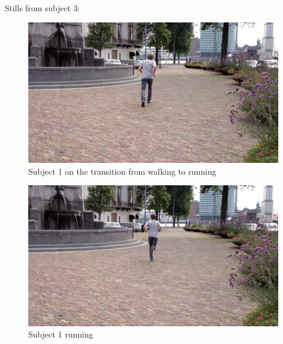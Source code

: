 
Stills from subject 3:

\begin{figure}
\centering
  \includegraphics[width=1\textwidth]{./Figures/chapter6/data_collection/stills/jos_cp_walk-run.png}
  \caption[Recording still 1]{Subject 1 on the transition from walking to running}
  \label{fig:data_gathering_still_1_still_walk_to_run}
\end{figure}

\begin{figure}
\centering
  \includegraphics[width=1\textwidth]{./Figures/chapter6/data_collection/stills/jos_run_2.png}
  \caption[Recording still 2]{Subject 1 running}
  \label{fig:data_gathering_still_1_running}
\end{figure}

